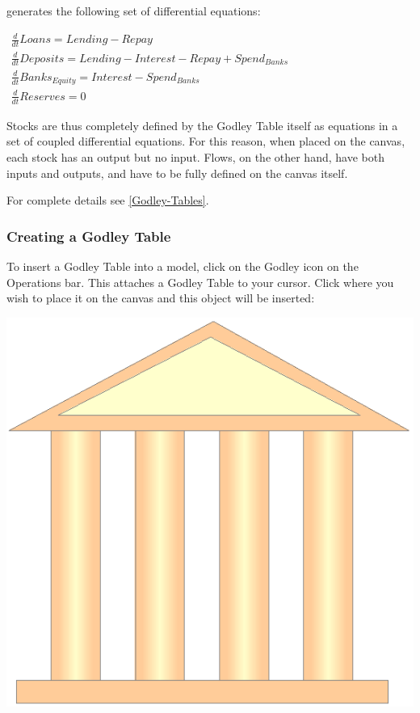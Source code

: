 generates the following set of differential equations:

$\begin{array}{c}
\frac{d}{dt}Loans=Lending-Repay\\
\frac{d}{dt}Deposits=Lending-Interest-Repay+Spend_{Banks}\\
\frac{d}{dt}Banks_{Equity}=Interest-Spend_{Banks}\\
\frac{d}{dt}Reserves=0
\end{array}$

Stocks are thus completely defined by the Godley Table itself as equations
in a set of coupled differential equations. For this reason, when
placed on the canvas, each stock has an output but no input. Flows,
on the other hand, have both inputs and outputs, and have to be fully
defined on the canvas itself.

For complete details see \ref{Godley-Tables}.

\subsubsection{Creating a Godley Table}

To insert a Godley Table into a model, click on the Godley icon on
the Operations bar. This attaches a Godley Table to your cursor. Click
where you wish to place it on the canvas and this object will be inserted:

\noindent\includegraphics[width=\textwidth]{images/GodleyTableIconMode}

